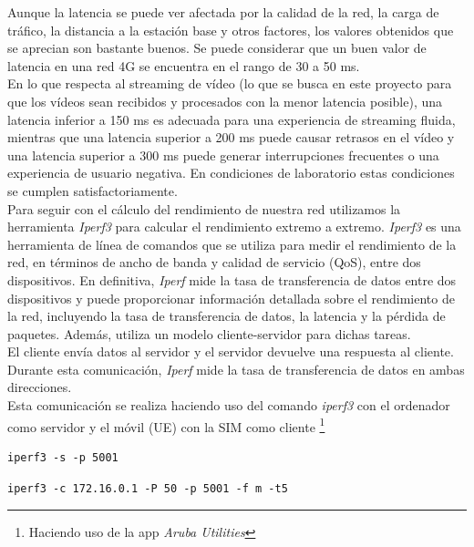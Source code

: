 Aunque la latencia se puede ver afectada por la calidad de la red, la carga de tráfico, la distancia a la estación base y otros factores, los valores obtenidos que se aprecian son bastante buenos. Se puede considerar que un buen valor de latencia en una red 4G se encuentra en el rango de 30 a 50 ms.\\

En lo que respecta al streaming de vídeo (lo que se busca en este proyecto para que los vídeos sean recibidos y procesados con la menor latencia posible), una latencia inferior a 150 ms es adecuada para una experiencia de streaming fluida, mientras que una latencia superior a 200 ms puede causar retrasos en el vídeo y una latencia superior a 300 ms puede generar interrupciones frecuentes o una experiencia de usuario negativa. En condiciones de laboratorio estas condiciones se cumplen satisfactoriamente. \\

Para seguir con el cálculo del rendimiento de nuestra red utilizamos la herramienta \textit{Iperf3} para calcular el rendimiento extremo a extremo. \textit{Iperf3} es una herramienta de línea de comandos que se utiliza para medir el rendimiento de la red, en términos de ancho de banda y calidad de servicio (QoS), entre dos dispositivos. En definitiva, \textit{Iperf} mide la tasa de transferencia de datos entre dos dispositivos y puede proporcionar información detallada sobre el rendimiento de la red, incluyendo la tasa de transferencia de datos, la latencia y la pérdida de paquetes. Además, utiliza un modelo cliente-servidor para dichas tareas.\\

El cliente envía datos al servidor y el servidor devuelve una respuesta al cliente. Durante esta comunicación, \textit{Iperf} mide la tasa de transferencia de datos en ambas direcciones.\\

Esta comunicación se realiza haciendo uso del comando \textit{iperf3} con el ordenador como servidor y el móvil (UE) con la SIM como cliente \footnote{Haciendo uso de la app \textit{Aruba Utilities}}

\begin{lstlisting}
iperf3 -s -p 5001
\end{lstlisting}

\begin{lstlisting}
iperf3 -c 172.16.0.1 -P 50 -p 5001 -f m -t5
\end{lstlisting}


